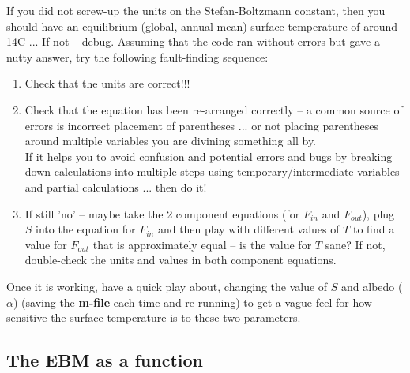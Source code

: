 \documentclass{tufte-book} %
\begin{document}
If you did not screw-up the units on the Stefan-Boltzmann constant, then you should have an equilibrium (global, annual mean) surface temperature of around 14\degree C ... If not -- debug. Assuming that the code ran without errors but gave a nutty answer, try the following fault-finding sequence:
\begin{enumerate}[noitemsep]
\setlength{\itemindent}{.2in}
\item Check that the units are correct!!!
\item Check that the equation has been re-arranged correctly -- a common source of errors is incorrect placement of parentheses ... or not placing parentheses around multiple variables you are divining something all by.
\\ If it helps you to avoid confusion and potential errors and bugs by breaking down calculations into multiple steps using temporary/intermediate variables and partial calculations ... then do it!
\item If still 'no' -- maybe take the 2 component equations (for \(F_{in}\) and \(F_{out}\)), plug \(S\) into the equation for \(F_{in}\) and then play with different values of \(T\) to find a value for \(F_{out}\) that is approximately equal -- is the value for \(T\) sane? If not, double-check the units and values in both component equations.
\end{enumerate} 

\noindent Once it is working, have a quick play about, changing the value of \(S\) and albedo (\(\alpha\)) (saving the \textbf{m-file} each time and re-running) to get a vague feel for how sensitive the surface temperature is to these two parameters.

%
\newpage

\subsection{The EBM as a function}
\end{document}
